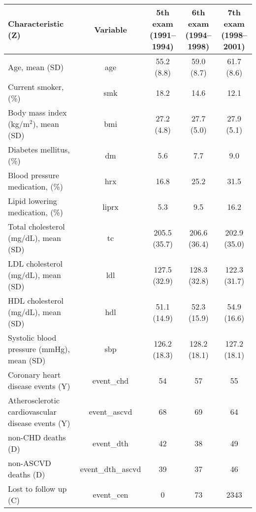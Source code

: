 \begin{table}[H]
\centering
\begin{tabular}{lcccc}
\toprule
Characteristic (Z) & Variable & \shortstack{5th exam \\ (1991–1994)} & \shortstack{6th exam \\ (1994–1998)} & \shortstack{7th exam \\ (1998–2001)}\\
\midrule
Age, mean (SD) & age & 55.2 (8.8) & 59.0 (8.7) & 61.7 (8.6)\\
Current smoker, (\%) & smk & 18.2 & 14.6 & 12.1\\
Body mass index (kg/m$^2$), mean (SD) & bmi & 27.2 (4.8) & 27.7 (5.0) & 27.9 (5.1)\\
Diabetes mellitus, (\%) & dm & 5.6 & 7.7 & 9.0\\
Blood pressure medication, (\%) & hrx & 16.8 & 25.2 & 31.5\\
Lipid lowering medication, (\%) & liprx & 5.3 & 9.5 & 16.2\\
Total cholesterol (mg/dL), mean (SD) & tc & 205.5 (35.7) & 206.6 (36.4) & 202.9 (35.0)\\
LDL cholesterol (mg/dL), mean (SD) & ldl & 127.5 (32.9) & 128.3 (32.8) & 122.3 (31.7)\\
HDL cholesterol (mg/dL), mean (SD) & hdl & 51.1 (14.9) & 52.3 (15.9) & 54.9 (16.6)\\
Systolic blood pressure (mmHg), mean (SD) & sbp & 126.2 (18.3) & 128.2 (18.1) & 127.2 (18.1)\\
\midrule
Coronary heart disease events (Y) & event_chd & 54 & 57 & 55\\
Atherosclerotic cardiovascular disease events (Y) & event_ascvd & 68 & 69 & 64\\
non-CHD deaths (D) & event_dth & 42 & 38 & 49\\
non-ASCVD deaths (D) & event_dth_ascvd & 39 & 37 & 46\\
Lost to follow up (C) & event_cen & 0 & 73 & 2343\\
\bottomrule
\end{tabular}
\end{table}
